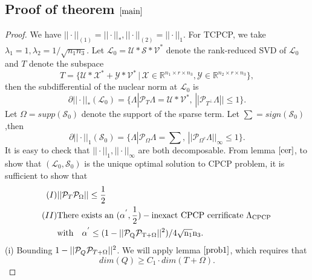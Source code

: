 \documentclass[journal,transmag]{IEEEtran}
\theoremstyle{plain}
\begin{document}
\subsection{Proof of theorem $\ref{main}$}
\begin{proof}

We have $||\cdot||_{(1)}=||\cdot||_{*}, ||\cdot||_{(2)}=||\cdot||_1$. For TCPCP, we take $\lambda_1=1,\lambda_2=1/\sqrt{n_1 n_3}$. Let $\mathcal{L}_0 = \mathcal{U*S*V}^{*}$ denote the rank-reduced SVD of $\mathcal{L}_0$ and $T$ denote the subspace
\begin{equation}
T = \{\mathcal{U}*\mathcal{X}^{*} + \mathcal{Y*V^{*}} \,|\, \mathcal{X}\in\mathbb{R}^{n_1 \times r \times n_3}, \mathcal{Y}\in \mathbb{R}^{n_2  \times r \times n_3}\},
\end{equation}
then the subdifferential of the nuclear norm at $\mathcal{L}_0$ is
\begin{equation}
\partial||\cdot||_{*}(\mathcal{L}_0)= \{  \Lambda | \mathcal{P}_T \Lambda = \mathcal{U*V^{*}}, \, ||\mathcal{P}_{T^{\bot}}\Lambda ||\le 1 \}.
\end{equation}
Let $\Omega= supp(\mathcal{S}_0)$ denote the support of the sparse term. Let $\sum=sign(\mathcal{S}_0)$ ,then
\begin{equation}
\partial||\cdot||_{1}(\mathcal{S}_0)= \{  \Lambda | \mathcal{P}_{\Omega} \Lambda = \sum, \, ||\mathcal{P}_{{\Omega}^{c}}\Lambda ||_{\infty}\le 1 \}.
\end{equation}
It is easy to check that $||\cdot||_1, ||\cdot||_{\infty}$ are both decomposable.
From lemma $\ref{cer}$, to show that $(\mathcal{L}_0, \mathcal{S}_0)$ is the unique optimal solution to CPCP problem, it is sufficient to show that
\begin{equation}
\begin{split}
(I) & ||\mathcal{P}_T \mathcal{P}_{\Omega}|| \le \frac{1}{2} \\
(II)& \rm{There\,\, exists\,\, an}\,\, (\alpha^{'},\frac{1}{2})-inexact \,\,CPCP \,\,cerrificate \,\, \Lambda_{CPCP}\, \\
& \rm{with}\quad \alpha^{'}\le (1-||\mathcal{P}_{Q^{\not}}\mathcal{P}_{T+\Omega}||^2)/4\sqrt{n_1}n_3.
\end{split}
\end{equation}
(i) Bounding $1-||\mathcal{P}_{Q^{\not}}\mathcal{P}_{T+\Omega}||^2$. We will apply lemma $\ref{prob1}$, which requires that
\begin{equation}
dim(Q)\ge C_1 \cdot dim(T+\Omega).
\end{equation}

\end{proof}
\end{document}
